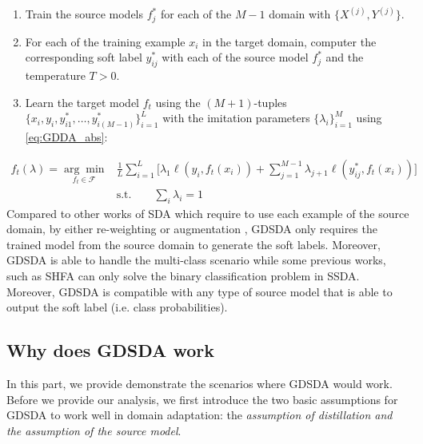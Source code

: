 \begin{enumerate}
    \item Train the source models $f^*_j$ for each of the $M-1$ domain with $\{X^{(j)},Y^{(j)}\}$.
    \item For each of the training example $x_i$ in the target domain, computer the corresponding soft label $y^*_{ij}$ with each of the source model $f^*_j$ and the temperature $T>0$.
    \item Learn the target model $f_t$ using the $(M+1)$-tuples $\{x_i,y_i,y^*_{i1},\dots,y^*_{i(M-1)}\}_{i=1}^L$ with the imitation parameters $\{\lambda_i\}^M_{i=1}$ using \eqref{eq:GDDA_abs}:
\end{enumerate} 
\begin{equation}\label{eq:GDDA_abs}
\begin{aligned}
f_t(\lambda)=\underset{f_t \in \mathcal{F}}{\arg \min}&\frac{1}{L}\sum_{i=1}^{L}\bigg[\lambda_1\ell\left(y_i,f_t(x_i)\right)+\sum_{j=1}^{M-1}\lambda_{j+1}\ell\left(y^*_{ij},f_t(x_i)\right)\bigg]\qquad\\
 &\text{s.t.} \qquad \sum_i\lambda_i=1
\end{aligned}
\end{equation}
Compared to other works of SDA which require to use each example of the source domain, by either re-weighting \cite{Donahue_2013_CVPR,duan2012visual} or augmentation \cite{daume2010frustratingly}, GDSDA only requires the trained model from the source domain to generate the soft labels. 
Moreover, GDSDA is able to handle the multi-class scenario while some previous works, such as SHFA\cite{duan2012learning} can only solve the binary classification problem in SSDA. Moreover, GDSDA is compatible with any type of source model that is able to output the soft label (i.e. class probabilities).

\subsection{Why does GDSDA work}
In this part, we provide demonstrate the scenarios where GDSDA would work. Before we provide our analysis, we first introduce the two basic assumptions for GDSDA to work well in domain adaptation: the \textit{assumption of distillation and the assumption of the source model}.

